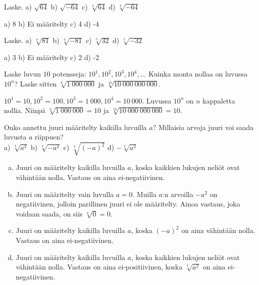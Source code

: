 \begin{tehtava}
Laske.
a) $\sqrt{64}$ \quad b) $\sqrt{-64}$ \quad c) $\sqrt[3]{64}$ \quad d) $\sqrt[3]{-64}$

\begin{vastaus}
a) 8 b) Ei määritelty c) 4 d) -4
\end{vastaus}
\end{tehtava}

\begin{tehtava}
Laske.
a) $\sqrt[4]{81}$ \quad b) $\sqrt[4]{-81}$ \quad c) $\sqrt[5]{32}$ \quad d) $\sqrt[5]{-32}$

\begin{vastaus}
a) 3 b) Ei määritelty c) 2 d) -2
\end{vastaus}
\end{tehtava}

\begin{tehtava}
Laske luvun $10$ potensseja: $10^1, 10^2, 10^3, 10^4, \ldots$ Kuinka monta nollaa on luvussa $10^n$? Laske sitten $\sqrt[6]{1~000~000}$ ja $\sqrt[10]{10~000~000~000}$.

\begin{vastaus}
$10^1 = 10, 10^2 = 100, 10^3 = 1~000, 10^4 = 10~000$. Luvussa $10^n$ on $n$ kappaletta nollia. Niinpä $\sqrt[6]{1~000~000} = 10$ ja $\sqrt[10]{10~000~000~000} = 10$.
\end{vastaus}
\end{tehtava}

\begin{tehtava}
Onko annettu juuri määritelty kaikilla luvuilla $a$? Millaisia arvoja juuri voi saada luvusta $a$ riippuen?\\
a) $\sqrt[4]{a^2}$ \quad b) $\sqrt[4]{-a^2}$ \quad c) $\sqrt[4]{(-a)^2}$ \quad d) $- \sqrt[4]{a^2}$

\begin{vastaus}

\begin{enumerate}[a)]
	\item Juuri on määritelty kaikilla luvuilla $a$, koska kaikkien lukujen neliöt ovat vähintään nolla. Vastaus on aina ei-negatiivinen.
	\item Juuri on määritelty vain luvulla $a = 0$. Muilla $a$:n arvoilla $-a^2$ on negatiivinen, jolloin parillinen juuri ei ole määritelty. Ainoa vastaus, joka voidaan saada, on siis $\sqrt[4]{0} = 0$.
	\item Juuri on määritelty kaikilla luvuilla $a$, koska $(-a)^2$ on aina vähintään nolla. Vastaus on aina ei-negatiivinen.
	\item Juuri on määritelty kaikilla luvuilla $a$, koska kaikkien lukujen neliöt ovat vähintään nolla. Vastaus on aina ei-positiivinen, koska $\sqrt[4]{a^2}$ on aina ei-negatiivinen.
\end{enumerate}
\end{vastaus}
\end{tehtava}

